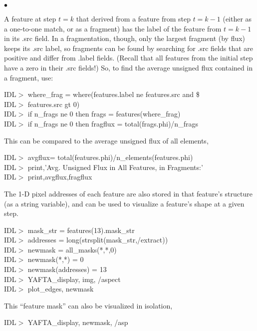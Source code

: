 \documentclass[12pt,preprint]{aastex}
\begin{document}
\begin{list}{$\bullet$}{}
%
\item 
A feature at step $t = k$ that derived from a feature from step $t =
k-1$ (either as a one-to-one match, or as a fragment) has the label of
the feature from $t = k-1$ in its .src field.  In a fragmentation, though,
only the largest fragment (by flux) keeps its .src label, so
fragments can be found by searching for .src fields that are positive
and differ from .label fields.  (Recall that all features from the
initial step have a zero in their .src fields!)  So, to find the
average unsigned flux contained in a fragment, use:
%
\par
\indent IDL$>$ where\_frag = where(features.label ne features.src and \$ \\
\indent IDL$>$ features.src gt 0) \\
\indent IDL$>$ if n\_frags ne 0 then frags = features(where\_frag) \\
\indent IDL$>$ if n\_frags ne 0 then fragflux = total(frags.phi)/n\_frags \\
\par
This can be compared to the average unsigned flux of all elements, 
%
\par
\indent IDL$>$ avgflux= total(features.phi)/n\_elements(features.phi) \\
\indent IDL$>$ print,'Avg. Unsigned Flux in All Features, in Fragments:' \\
\indent IDL$>$ print,avgflux,fragflux \\
%
\item The 1-D pixel addresses of each feature are also stored in that
feature's structure (as a string variable), and can be used to
visualize a feature's shape at a given step.
%
\par
\indent IDL$>$ mask\_str = features(13).mask\_str  \\
\indent IDL$>$ addresses = long(strsplit(mask\_str,/extract)) \\
\indent IDL$>$ newmask = all\_masks(*,*,0) \\
\indent IDL$>$ newmask(*,*) = 0 \\
\indent IDL$>$ newmask(addresses) = 13 \\
\indent IDL$>$ YAFTA\_display, img, /aspect \\
\indent IDL$>$ plot\_edges, newmask \\
\par
%
This ``feature mask'' can also be visualized in isolation,
%
\par
\indent IDL$>$ YAFTA\_display, newmask, /asp \\

\end{list}
\end{document}
